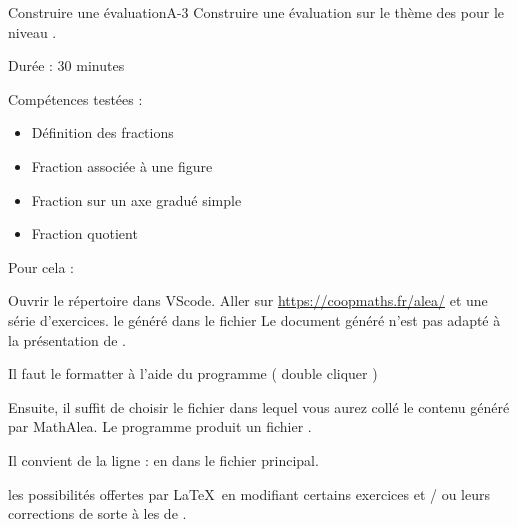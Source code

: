 \def\rdifficulty{2}\begin{EXO}{Construire une évaluation}{A-3}
    Construire une évaluation sur le thème des  pour le niveau .

    Durée : 30 minutes

    Compétences testées : 
    \begin{itemize}[label=$\bullet$]
        \item Définition des fractions
        \item Fraction associée à une figure 
        \item Fraction sur un axe gradué simple
        \item Fraction quotient
    \end{itemize}

    Pour cela : 
    \begin{tcbenumerate}
        \tcbitem Ouvrir le répertoire  dans VScode.
        \tcbitem Aller sur \href{https://coopmaths.fr/alea/}{https://coopmaths.fr/alea/} et  une série d'exercices.
        \tcbitem {} le  généré dans le fichier 
        \tcbitem \bcattention Le document généré n'est pas adapté à la présentation de \bfcours. 

        Il faut le formatter à l'aide du programme  ( double cliquer )

        Ensuite, il suffit de choisir le fichier  dans lequel vous aurez collé le contenu généré par MathAlea.
        \tcbitem Le programme produit un fichier . 

        Il convient de  la ligne : 
         en  dans le fichier principal.

        \tcbitem {} les possibilités offertes par \LaTeX\ en modifiant certains exercices et / ou leurs corrections de sorte à  les  de \bfcours.
    \end{tcbenumerate}
\end{EXO}